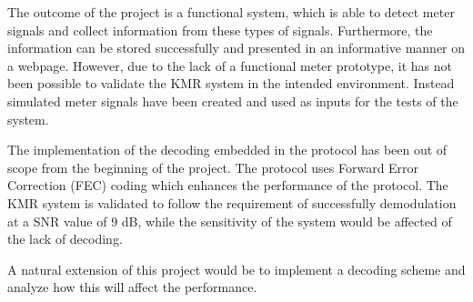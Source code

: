 The outcome of the project is a functional system, which is able to detect meter signals and collect information from these types of signals. Furthermore, the information can be stored successfully and presented in an informative manner on a webpage. However, due to the lack of a functional meter prototype, it has not been possible to validate the KMR system in the intended environment. Instead simulated meter signals have been created and used as inputs for the tests of the system.

The implementation of the decoding embedded in the protocol has been out of scope from the beginning of the project. The protocol uses Forward Error Correction (FEC) coding which enhances the performance of the protocol. The KMR system is validated to follow the requirement of successfully demodulation at a SNR value of 9 dB, while the sensitivity of the system would be affected of the lack of decoding.

A natural extension of this project would be to implement a decoding scheme and analyze how this will affect the performance.  
